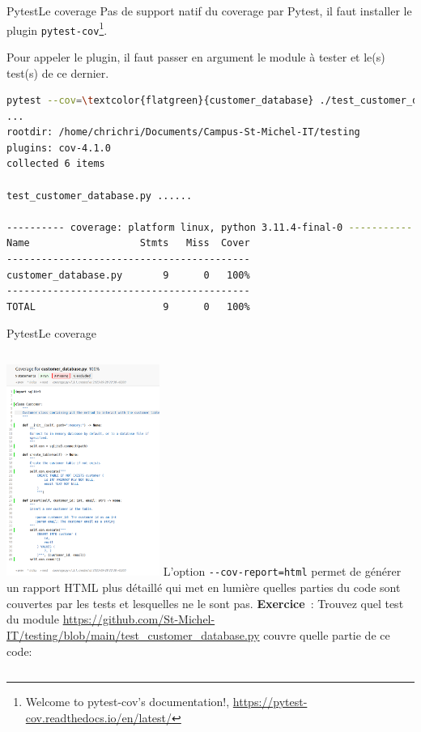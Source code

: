 \documentclass{beamer}
\begin{document}
    \begin{frame}[fragile]{Pytest}{Le coverage}
        \transdissolve
        Pas de support natif du coverage par Pytest, il faut installer le plugin \lstinline{pytest-cov}\footnote{Welcome to pytest-cov’s documentation!, \url{https://pytest-cov.readthedocs.io/en/latest/}}.

        Pour appeler le plugin, il faut passer en argument le module à tester et le(s) test(s) de ce dernier.


        \begin{lstlisting}[language=sh]
pytest --cov=\textcolor{flatgreen}{customer_database} ./test_customer_database.py
...
rootdir: /home/chrichri/Documents/Campus-St-Michel-IT/testing
plugins: cov-4.1.0
collected 6 items

test_customer_database.py ......                                                                                                                                                                                                 [100%]

---------- coverage: platform linux, python 3.11.4-final-0 -----------
Name                   Stmts   Miss  Cover
------------------------------------------
customer_database.py       9      0   100%
------------------------------------------
TOTAL                      9      0   100%
        \end{lstlisting}

    \end{frame}

    \begin{frame}{Pytest}{Le coverage}
        \transdissolve
        \begin{columns}

            \centering
            \includegraphics[width=5cm]{image/html-coverage}
            L'option \lstinline{--cov-report=html} permet de générer un rapport HTML plus détaillé qui met en lumière quelles parties du code sont couvertes par les tests et lesquelles ne le sont pas.
            \bigbreak
            \textbf{Exercice}~: Trouvez quel test du module \url{https://github.com/St-Michel-IT/testing/blob/main/test_customer_database.py} couvre quelle partie de ce code:
        \end{columns}

    \end{frame}
\end{document}
